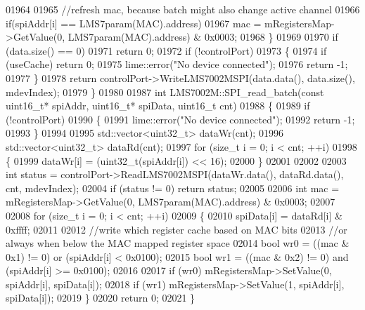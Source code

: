 \begin{DoxyCode}
{{{{{{{{{{{{{{{{{{{{{{{{{{{{{{{{{{{{{{{{{{{{{{{{{{{{{{{01964 
01965         \textcolor{comment}{//refresh mac, because batch might also change active channel}
01966         \textcolor{keywordflow}{if}(spiAddr[i] == LMS7param(MAC).address)
01967             mac = mRegistersMap->GetValue(0, LMS7param(MAC).address) & 0x0003;
01968     \}
01969 
01970     \textcolor{keywordflow}{if} (data.size() == 0)
01971         \textcolor{keywordflow}{return} 0;
01972     \textcolor{keywordflow}{if} (!controlPort)
01973     \{
01974         \textcolor{keywordflow}{if} (useCache) \textcolor{keywordflow}{return} 0;
01975         lime::error(\textcolor{stringliteral}{"No device connected"});
01976         \textcolor{keywordflow}{return} -1;
01977     \}
01978     \textcolor{keywordflow}{return} controlPort->WriteLMS7002MSPI(data.data(), data.size(), mdevIndex);
01979 \}
01980 
01987 \textcolor{keywordtype}{int} LMS7002M::SPI_read_batch(\textcolor{keyword}{const} uint16\_t* spiAddr, uint16\_t* spiData, uint16\_t cnt)
01988 \{
01989     \textcolor{keywordflow}{if} (!controlPort)
01990     \{
01991         lime::error(\textcolor{stringliteral}{"No device connected"});
01992         \textcolor{keywordflow}{return} -1;
01993     \}
01994 
01995     std::vector<uint32\_t> dataWr(cnt);
01996     std::vector<uint32\_t> dataRd(cnt);
01997     \textcolor{keywordflow}{for} (\textcolor{keywordtype}{size\_t} i = 0; i < cnt; ++i)
01998     \{
01999         dataWr[i] = (uint32\_t(spiAddr[i]) << 16);
02000     \}
02001 
02002 
02003     \textcolor{keywordtype}{int} status = controlPort->ReadLMS7002MSPI(dataWr.data(), dataRd.data(), cnt,
      mdevIndex);
02004     \textcolor{keywordflow}{if} (status != 0) \textcolor{keywordflow}{return} status;
02005 
02006     \textcolor{keywordtype}{int} mac = mRegistersMap->GetValue(0, LMS7param(MAC).address) & 0x0003;
02007 
02008     \textcolor{keywordflow}{for} (\textcolor{keywordtype}{size\_t} i = 0; i < cnt; ++i)
02009     \{
02010         spiData[i] = dataRd[i] & 0xffff;
02011 
02012         \textcolor{comment}{//write which register cache based on MAC bits}
02013         \textcolor{comment}{//or always when below the MAC mapped register space}
02014         \textcolor{keywordtype}{bool} wr0 = ((mac & 0x1) != 0) or (spiAddr[i] < 0x0100);
02015         \textcolor{keywordtype}{bool} wr1 = ((mac & 0x2) != 0) and (spiAddr[i] >= 0x0100);
02016 
02017         \textcolor{keywordflow}{if} (wr0) mRegistersMap->SetValue(0, spiAddr[i], spiData[i]);
02018         \textcolor{keywordflow}{if} (wr1) mRegistersMap->SetValue(1, spiAddr[i], spiData[i]);
02019     \}
02020     \textcolor{keywordflow}{return} 0;
02021 \}
}}}}}}}}}}}}}}}}}}}}}}}}}}}}}}}}}}}}}}}}}}}}}}}}}}}}}}}
\end{DoxyCode}
